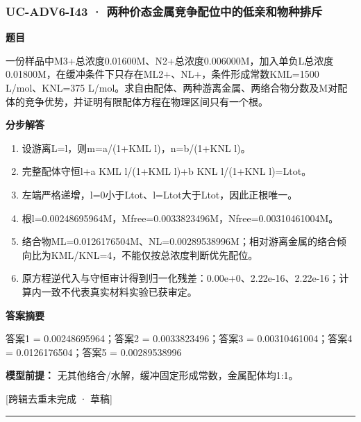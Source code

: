 \documentclass[UTF8,11pt,a4paper]{ctexart}
\begin{document}
\subsubsection*{UC-ADV6-I43 · 两种价态金属竞争配位中的低亲和物种排斥}
\noindent\textbf{题目}\par
一份样品中M3+总浓度0.01600M、N2+总浓度0.006000M，加入单负L总浓度0.01800M，在缓冲条件下只存在ML2+、NL+，条件形成常数KML=1500 L/mol、KNL=375 L/mol。求自由配体、两种游离金属、两络合物分数及M对配体的竞争优势，并证明有限配体方程在物理区间只有一个根。\par
\medskip\noindent\textbf{分步解答}
\begin{enumerate}
\item 设游离L=l，则m=a/(1+KML l)，n=b/(1+KNL l)。
\item 完整配体守恒l+a KML l/(1+KML l)+b KNL l/(1+KNL l)=Ltot。
\item 左端严格递增，l=0小于Ltot、l=Ltot大于Ltot，因此正根唯一。
\item 根l=0.00248695964M，Mfree=0.0033823496M，Nfree=0.00310461004M。
\item 络合物ML=0.0126176504M、NL=0.00289538996M；相对游离金属的络合倾向比为KML/KNL=4，不能仅按总浓度判断优先配位。
\item 原方程逆代入与守恒审计得到归一化残差：0.00e+0、2.22e-16、2.22e-16；计算内一致不代表真实材料实验已获审定。
\end{enumerate}
\noindent\textbf{答案摘要}\par
答案1 = 0.00248695964；答案2 = 0.0033823496；答案3 = 0.00310461004；答案4 = 0.0126176504；答案5 = 0.00289538996\par
\noindent\textbf{模型前提：}
无其他络合/水解，缓冲固定形成常数，金属配体均1:1。\par
\noindent\textcolor{red!65!black}{[跨辑去重未完成 · 草稿]} \par
\medskip\hrule\medskip
{}
\end{document}
